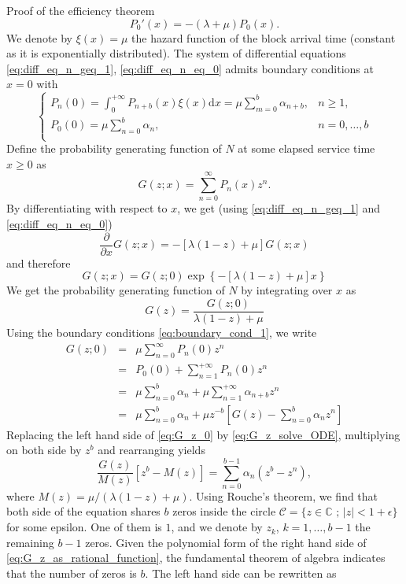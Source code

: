 \documentclass{beamer}
\begin{document}
{\begin{frame}[allowframebreaks]{Proof of the efficiency theorem}
\begin{equation}
P_{0}'(x) = -(\lambda+\mu)P_{0}(x).
\end{equation}
We denote by $\xi(x) = \mu$ the hazard function of the block arrival time (constant as it is exponentially distributed). The system of differential equations \eqref{eq:diff_eq_n_geq_1}, \eqref{eq:diff_eq_n_eq_0} admits boundary conditions at $x = 0$ with 
\begin{equation}\label{eq:boundary_cond_1}
\begin{cases}
P_{n}(0) = \int_0^{+\infty} P_{n+b}(x)\xi(x)\text{d}x = \mu\sum_{m=0}^{b}\alpha_{n+b},&n \geq1,\\
P_{0}(0) = \mu\sum_{n=0}^{b}\alpha_n,&n = 0,\ldots,b\\
\end{cases}
\end{equation}
Define the probability generating function of $N$ at some elapsed service time $x\geq 0$ as 
$$
G(z;x) = \sum_{n=0}^\infty P_{n}(x)z^n.
$$
By differentiating with respect to $x$, we get (using \eqref{eq:diff_eq_n_geq_1} and \eqref{eq:diff_eq_n_eq_0})
$$
\frac{\partial}{\partial x}G(z;x) = -\left[\lambda(1-z)+\mu\right]G(z;x)
$$
and therefore
$$
G(z;x) = G(z;0)\exp\left\{-\left[\lambda(1-z)+\mu\right]x\right\}
$$
We get the probability generating function of $N$ by integrating over $x$ as 
\begin{equation}\label{eq:G_z_solve_ODE}
G(z) = \frac{G(z;0)}{\lambda(1-z)+\mu}
\end{equation}
Using the boundary conditions \eqref{eq:boundary_cond_1}, we write 
\begin{eqnarray}
G(z;0) &= &\mu \sum_{n = 0}^\infty P_{n}(0)z^n \nonumber\\
&= &P_{0}(0)+\sum_{n=1}^{+\infty}P_{n}(0)z^n\nonumber\\
&=& \mu\sum_{n = 0}^{b}\alpha_n  + \mu\sum_{n=1}^{+\infty}\alpha_{n+b} z^n\nonumber\\
&=& \mu\sum_{n = 0}^{b}\alpha_n + \mu z^{-b}\left[G(z)-\sum_{n = 0}^{b}\alpha_n z^n\right]\label{eq:G_z_0}
\end{eqnarray}
Replacing the left hand side of \eqref{eq:G_z_0} by \eqref{eq:G_z_solve_ODE}, multiplying on both side by $z^b$ and rearranging yields 
\begin{equation}\label{eq:G_z_as_rational_function}
\frac{G(z)}{M(z)}[z^b - M(z)] =\sum_{n=0}^{b-1}\alpha_n(z^b - z^n), 
\end{equation}
where $M(z) = \mu/(\lambda(1-z)+\mu)$. Using Rouche's theorem, we find that both side of the equation shares $b$ zeros inside the circle $\mathcal{C} = \{z\in\mathbb{C}\text{ ; }|z| <1+\epsilon\}$ for some epsilon. One of them is $1$, and we denote by $z_k$, $k = 1,\ldots, b-1$ the remaining $b-1$ zeros. Given the polynomial form of the right hand side of \eqref{eq:G_z_as_rational_function}, the fundamental theorem of algebra indicates that the number of zeros is $b$. The left hand side can be rewritten as

\end{frame}}
\end{document}
